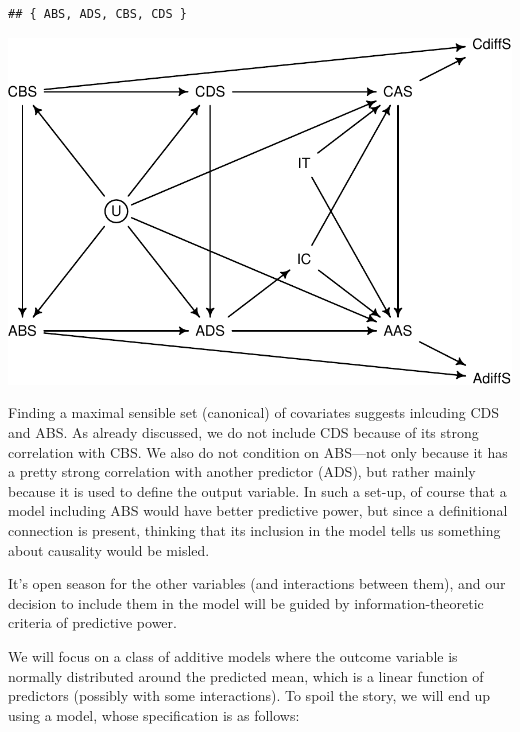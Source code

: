 \documentclass[
  10pt,
  dvipsnames,enabledeprecatedfontcommands]{scrartcl}
\begin{document}
\begin{verbatim}
## { ABS, ADS, CBS, CDS }
\end{verbatim}

\begin{center}\includegraphics[width=0.8\linewidth]{bayesianReport3_files/figure-latex/dag2-1} \end{center}

Finding a maximal sensible set (canonical) of covariates suggests
inlcuding \textsf{CDS} and \textsf{ABS}. As already discussed, we do not
include \textsf{CDS} because of its strong correlation with
\textsf{CBS}. We also do not condition on \textsf{ABS}---not only
because it has a pretty strong correlation with another predictor
(\textsf{ADS}), but rather mainly because it is used to define the
output variable. In such a set-up, of course that a model including
\textsf{ABS} would have better predictive power, but since a
definitional connection is present, thinking that its inclusion in the
model tells us something about causality would be misled.

It's open season for the other variables (and interactions between
them), and our decision to include them in the model will be guided by
information-theoretic criteria of predictive power.

We will focus on a class of additive models where the outcome variable
is normally distributed around the predicted mean, which is a linear
function of predictors (possibly with some interactions). To spoil the
story, we will end up using a model, whose specification is as follows:
\end{document}
